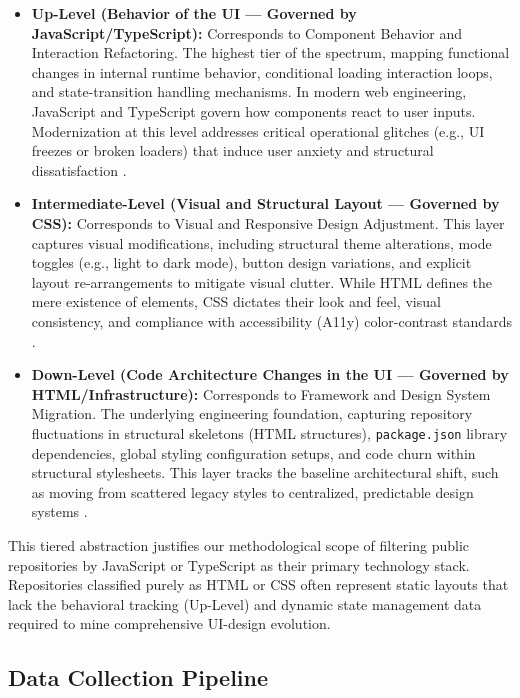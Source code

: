 \documentclass{article}
\begin{document}
\begin{itemize}
    \item \textbf{Up-Level (Behavior of the UI --- Governed by
    JavaScript/TypeScript):} Corresponds to Component Behavior and
    Interaction Refactoring. The highest tier of the spectrum, mapping
    functional changes in internal runtime behavior, conditional loading
    interaction loops, and state-transition handling mechanisms. In
    modern web engineering, JavaScript and TypeScript govern how
    components react to user inputs. Modernization at this level
    addresses critical operational glitches (e.g., UI freezes or broken
    loaders) that induce user anxiety and structural dissatisfaction
    \cite{lamine2022understanding, khalajzadeh2022how}.
    \item \textbf{Intermediate-Level (Visual and Structural Layout ---
    Governed by CSS):} Corresponds to Visual and Responsive Design
    Adjustment. This layer captures visual modifications, including
    structural theme alterations, mode toggles (e.g., light to dark
    mode), button design variations, and explicit layout re-arrangements
    to mitigate visual clutter. While HTML defines the mere existence of
    elements, CSS dictates their look and feel, visual consistency, and
    compliance with accessibility (A11y) color-contrast standards
    \cite{lamine2022understanding, llerena2019adapting}.
    \item \textbf{Down-Level (Code Architecture Changes in the UI ---
    Governed by HTML/Infrastructure):} Corresponds to Framework and
    Design System Migration. The underlying engineering foundation,
    capturing repository fluctuations in structural skeletons (HTML
    structures), \texttt{package.json} library dependencies, global
    styling configuration setups, and code churn within structural
    stylesheets. This layer tracks the baseline architectural shift,
    such as moving from scattered legacy styles to centralized,
    predictable design systems \cite{lamine2022understanding}.
\end{itemize}

This tiered abstraction justifies our methodological scope of filtering
public repositories by JavaScript or TypeScript as their primary
technology stack. Repositories classified purely as HTML or CSS often
represent static layouts that lack the behavioral tracking (Up-Level) and
dynamic state management data required to mine comprehensive UI-design
evolution.

\subsection{Data Collection Pipeline}
\label{sec:repo-selection}
\end{document}

